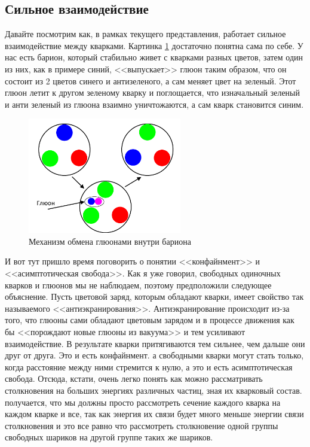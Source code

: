 \documentclass[12pt]{article}
\begin{document}
\subsection{Сильное взаимодействие}
Давайте посмотрим как, в рамках текущего представления, работает сильное взаимодействие между кварками. Картинка \ref{fig:sem_11_quark} достаточно понятна сама по себе. У нас есть барион, который стабильно живет с кварками разных цветов, затем один из них, как в примере синий, <<выпускает>> глюон таким образом, что он состоит из 2 цветов синего и антизеленого, а сам меняет цвет на зеленый. Этот глюон летит к другом зеленому кварку и поглощается, что изначальный зеленый и анти зеленый из глюона взаимно уничтожаются, а сам кварк становится синим.
\begin{figure}[h]
    \centering
    \includegraphics[width=0.6\textwidth,height=\textheight,keepaspectratio]{Seminar_11/pics/pic_02_stong.pdf}
    \caption{Механизм обмена глюонами внутри бариона}
    \label{fig:sem_11_quark}
\end{figure}

И вот тут пришло время поговорить о понятии <<конфайнмент>> и <<асимптотическая свобода>>. Как я уже говорил, свободных одиночных кварков и глюонов мы не наблюдаем, поэтому предположили следующее объяснение. Пусть цветовой заряд, которым обладают кварки, имеет свойство так называемого <<антиэкранирования>>. Антиэкранирование происходит из-за того, что глюоны сами обладают цветовым зарядом и в процессе движения как бы <<порождают новые глюоны из вакуума>> и тем усиливают взаимодействие. В результате кварки притягиваются тем сильнее, чем дальше они друг от друга. Это и есть конфайнмент. а свободными кварки могут стать только, когда расстояние между ними стремится к нулю, а это и есть асимптотическая свобода. Отсюда, кстати, очень легко понять как можно рассматривать столкновения на больших энергиях различных частиц, зная их кварковый состав. получается, что мы должны просто рассмотреть сечение каждого кварка на каждом кварке и все, так как энергия их связи будет много меньше энергии связи столкновения и это все равно что рассмотреть столкновение одной группы  свободных шариков на другой группе таких же шариков.
\end{document}
